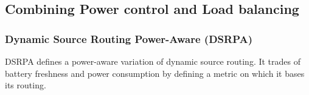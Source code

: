 \subsection{Combining Power control and Load balancing}
\subsubsection{Dynamic Source Routing Power-Aware (DSRPA)}
DSRPA\cite{djenouri2006new} defines a power-aware variation of dynamic source
routing. It trades of battery freshness and power consumption by defining a
metric on which it bases its routing.
